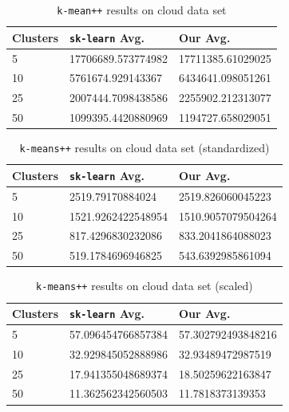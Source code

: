 \documentclass[12pt]{article}
\begin{document}
		\begin{table}[p]
			\begin{center}
				\begin{tabular}{|l|l|l|}
					\hline
					Clusters & \texttt{sk-learn} Avg. & Our Avg.\\\hline
					5 & 17706689.573774982& 17711385.61029025\\\hline
					10 & 5761674.929143367& 6434641.098051261\\\hline
					25 & 2007444.7098438586& 2255902.212313077\\\hline
					50 & 1099395.4420880969& 1194727.658029051\\\hline
				\end{tabular}
				\caption{\texttt{k-mean++} results on cloud data set}
				\label{tbl:cloud_no_preprocess}
			\end{center}
		\end{table}

		\begin{table}[p]
			\begin{center}
				\begin{tabular}{|l|l|l|}
					\hline
					Clusters & \texttt{sk-learn} Avg. & Our Avg.\\\hline
					5 & 2519.79170884024 & 2519.826060045223\\\hline
					10 & 1521.9262422548954 & 1510.9057079504264\\\hline
					25 & 817.4296830232086 & 833.2041864088023\\\hline
					50 & 519.1784696946825 & 543.6392985861094\\\hline
				\end{tabular}
				\caption{\texttt{k-means++} results on cloud data set (standardized)}
				\label{tbl:cloud_standardscaler}
			\end{center}
		\end{table}

		\begin{table}[p]
			\begin{center}
				\begin{tabular}{|l|l|l|}
					\hline
					Clusters & \texttt{sk-learn} Avg. & Our Avg.\\\hline
					5 & 57.096454766857384 & 57.302792493848216\\\hline
					10 & 32.929845052888986 & 32.93489472987519\\\hline
					25 & 17.941355048689374 & 18.50259622163847\\\hline
					50 & 11.362562342560503 & 11.7818373139353\\\hline
				\end{tabular}
				\caption{\texttt{k-means++} results on cloud data set (scaled)}
				\label{tbl:cloud_minmaxscaler}
			\end{center}
		\end{table}
	\clearpage
\end{document}

